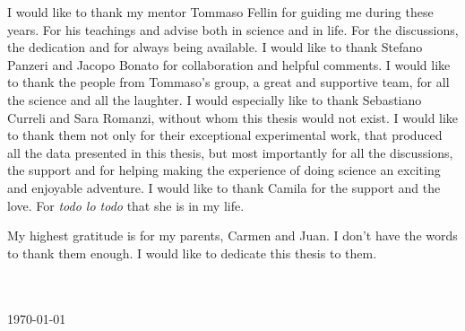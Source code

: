 \begin{acknowledgements}
\setcounter{page}{2}
\addchaptertocentry{\acknowledgementname} %
\vspace{1cm}


\noindent I would like to thank my mentor Tommaso Fellin for guiding me during these years. 
For his teachings and advise both in science and in life. 
For the discussions, the dedication and for always being available.
I would like to thank Stefano Panzeri and Jacopo Bonato for collaboration and helpful comments.
I would like to thank the people from Tommaso's group, a great and supportive team, for all the science and all the laughter.  
I would especially like to thank Sebastiano Curreli and Sara Romanzi, without whom this thesis would not exist. 
I would like to thank them not only for their exceptional experimental work, that produced all the data presented in this thesis, but most importantly for all the discussions, the support and for helping making the experience of doing science an exciting and enjoyable adventure. 
I would like to thank Camila for the support and the love. For \textit{todo lo todo} that she is in my life.

My highest gratitude is for my parents, Carmen and Juan. I don't have the words to thank them enough. I would like to dedicate this thesis to them.  
\\[0.4cm]

\begin{flushright}
    \authorname \\
    \univname \\
    \usdate\today
\end{flushright}

\end{acknowledgements}